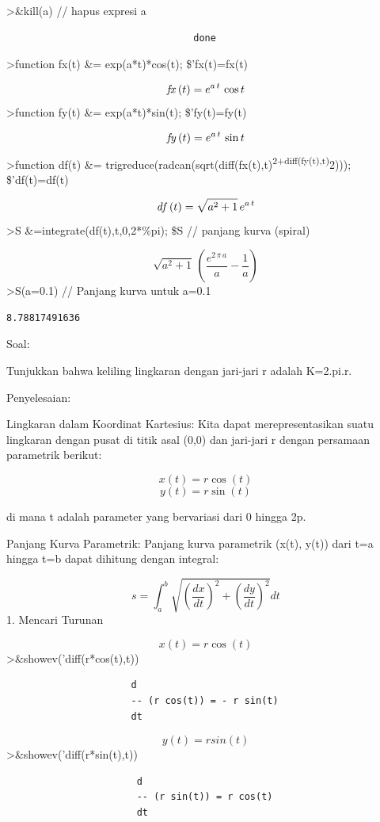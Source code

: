\documentclass[
]{book}
\begin{document}
\textgreater\&kill(a) // hapus expresi a

\begin{verbatim}
                                 done
\end{verbatim}

\textgreater function fx(t) \&= exp(a*t)*cos(t); \$'fx(t)=fx(t)

\[{\it fx}\left(t\right)=e^{a\,t}\,\cos t\]\textgreater function fy(t) \&= exp(a*t)*sin(t); \$'fy(t)=fy(t)

\[{\it fy}\left(t\right)=e^{a\,t}\,\sin t\]\textgreater function df(t) \&= trigreduce(radcan(sqrt(diff(fx(t),t)\textsuperscript{2+diff(fy(t),t)}2))); \$'df(t)=df(t)

\[{\it df}\left(t\right)=\sqrt{a^2+1}\,e^{a\,t}\]\textgreater S \&=integrate(df(t),t,0,2*\%pi); \$S // panjang kurva (spiral)

\[\sqrt{a^2+1}\,\left(\frac{e^{2\,\pi\,a}}{a}-\frac{1}{a}\right)\]\textgreater S(a=0.1) // Panjang kurva untuk a=0.1

\begin{verbatim}
8.78817491636
\end{verbatim}

Soal:

Tunjukkan bahwa keliling lingkaran dengan jari-jari r adalah K=2.pi.r.

Penyelesaian:

Lingkaran dalam Koordinat Kartesius: Kita dapat merepresentasikan suatu lingkaran dengan pusat di titik asal (0,0) dan jari-jari r dengan persamaan parametrik berikut:

\[x(t) = r \cos(t)\]\[y(t) = r \sin(t)\]

di mana t adalah parameter yang bervariasi dari 0 hingga 2p.

Panjang Kurva Parametrik: Panjang kurva parametrik (x(t), y(t)) dari t=a hingga t=b dapat dihitung dengan integral:

\[s = \int_a^b \sqrt{\left(\frac{dx}{dt}\right)^2 + \left(\frac{dy}{dt}\right)^2} dt\]1. Mencari Turunan

\[x(t) = r \cos(t)\]\textgreater\&showev('diff(r*cos(t),t))

\begin{verbatim}
                      d
                      -- (r cos(t)) = - r sin(t)
                      dt
\end{verbatim}

\[y(t)=rsin(t)\]\textgreater\&showev('diff(r*sin(t),t))

\begin{verbatim}
                       d
                       -- (r sin(t)) = r cos(t)
                       dt
\end{verbatim}
\end{document}
